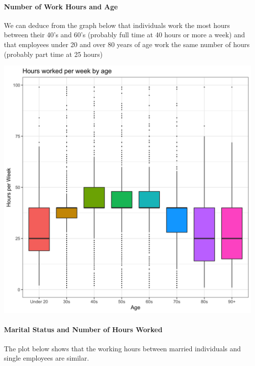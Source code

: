 \documentclass[]{article}
\let\oldparagraph\paragraph
\renewcommand{\paragraph}[1]{\oldparagraph{#1}\mbox{}}
\begin{document}
\hypertarget{number-of-work-hours-and-age}{%
\paragraph{Number of Work Hours and
Age}\label{number-of-work-hours-and-age}}

We can deduce from the graph below that individuals work the most hours
between their 40's and 60's (probably full time at 40 hours or more a
week) and that employees under 20 and over 80 years of age work the same
number of hours (probably part time at 25 hours)

\includegraphics{../images/Plot_3_Hours_worked_per_week_by_age.png}

\hypertarget{marital-status-and-number-of-hours-worked}{%
\paragraph{Marital Status and Number of Hours
Worked}\label{marital-status-and-number-of-hours-worked}}

The plot below shows that the working hours between married individuals
and single employees are similar.
\end{document}
